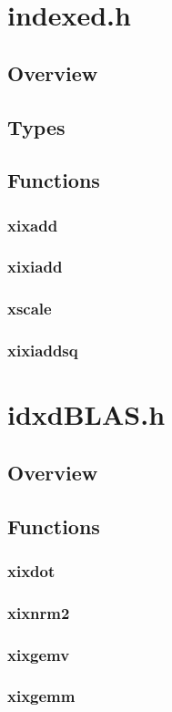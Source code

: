 \documentclass[12pt]{article}
\theoremstyle{plain}
\begin{document}
\section{indexed.h}
  \subsection{Overview}
  \subsection{Types}
  \subsection{Functions}
    \subsubsection{xixadd}
    \subsubsection{xixiadd}
    \subsubsection{xscale}
    \subsubsection{xixiaddsq}
\section{idxdBLAS.h}
  \subsection{Overview}
  \subsection{Functions}
    \subsubsection{xixdot}
    \subsubsection{xixnrm2}
    \subsubsection{xixgemv}
    \subsubsection{xixgemm}
\end{document}
